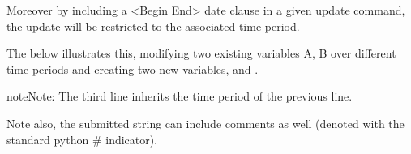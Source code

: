 \documentclass[letterpaper,10pt,english]{jupyterBook}
\begin{document}
\sphinxAtStartPar
Moreover by including a <Begin End> date clause in a given update command, the update will be restricted to the associated time period.

\sphinxAtStartPar
The below illustrates this, modifying two existing variables A, B over different time periods and creating two new variables,  and .

\begin{sphinxadmonition}{note}{Note:}
\sphinxAtStartPar
The third line inherits the time period of the previous line.

\sphinxAtStartPar
Note also, the submitted string can include comments as well (denoted with the standard python \# indicator).
\end{sphinxadmonition}
\end{document}
